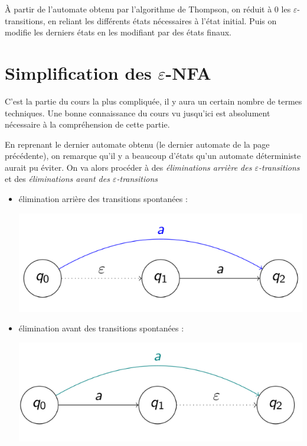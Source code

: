 \documentclass{article}
\begin{document}
\begin{itemize}
À partir de l'automate obtenu par l'algorithme de Thompson, on réduit à 0 les $\varepsilon$-transitions, en reliant les différents états nécessaires à l'état initial. Puis on modifie les derniers états en les modifiant par des états finaux.
\end{itemize}\newpage
\section{Simplification des $\varepsilon$-NFA}
C'est la partie du cours la plus compliquée, il y aura un certain nombre de termes techniques. Une bonne connaissance du cours vu jusqu'ici est absolument nécessaire à la compréhension de cette partie.\par
En reprenant le dernier automate obtenu (le dernier automate de la page précédente), on remarque qu'il y a beaucoup d'états qu'un automate déterministe aurait pu éviter. On va alors procéder à des \textit{éliminations arrière des $\varepsilon$-transitions} et des \textit{éliminations avant des $\varepsilon$-transitions}
\begin{itemize}
    \item élimination arrière des transitions spontanées :
    \begin{center}
        \includegraphics[scale=0.3]{Image9.png}
    \end{center}    
    \item élimination avant des transitions spontanées :
    \begin{center}
        \includegraphics[scale=0.3]{Image10.png}
    \end{center}
\end{itemize}
\end{document}
